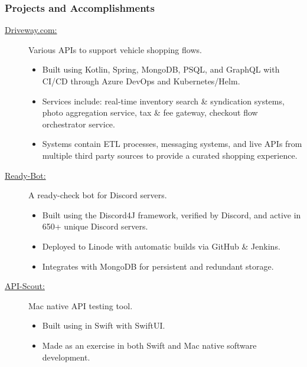 \documentclass{article}
\begin{document}
\subsubsection*{Projects and Accomplishments}
    \begin{description}

        \item[\href{https://driveway.com/shop}{Driveway.com:\hspace{0.075in}}] Various APIs to support vehicle shopping flows.
            \begin{itemize}
                \item Built using Kotlin, Spring, MongoDB, PSQL, and GraphQL with CI/CD through Azure DevOps and Kubernetes/Helm.
                \item Services include: real-time inventory search \& syndication systems, photo aggregation service, tax \& fee gateway, checkout flow orchestrator service.
                \item Systems contain ETL processes, messaging systems, and live APIs from multiple third party sources to provide a curated shopping experience.
            \end{itemize}

            \vspace{0.5em}
        \item[\href{https://www.github.com/BurnsCommaLucas/ready-botlin}{Ready-Bot:\hspace{0.075in}}] A ready-check bot for Discord servers.
            \begin{itemize}
                \item Built using the Discord4J framework, verified by Discord, and active in 650+ unique Discord servers.
                \item Deployed to Linode with automatic builds via GitHub \& Jenkins.
                \item Integrates with MongoDB for persistent and redundant storage.
            \end{itemize}

            \vspace{0.5em}

        \item[\href{https://github.com/BurnsCommaLucas/API-Scout}{API-Scout:\hspace{0.075in}}] Mac native API testing tool.
            \begin{itemize}
            	\item Built using in Swift with SwiftUI.
            	\item Made as an exercise in both Swift and Mac native software development.
            \end{itemize}


\end{description}
\end{document}
